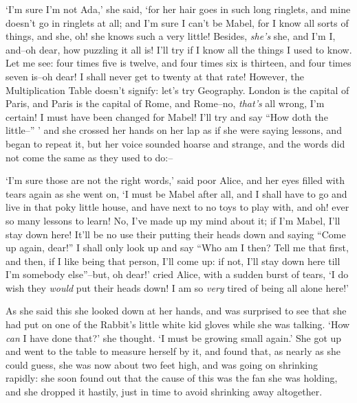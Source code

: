   `I'm sure I'm not Ada,' she said, `for her hair goes in such
long ringlets, and mine doesn't go in ringlets at all; and I'm
sure I can't be Mabel, for I know all sorts of things, and she,
oh! she knows such a very little!  Besides, {\it she's} she, and I'm I,
and--oh dear, how puzzling it all is!  I'll try if I know all the
things I used to know.  Let me see:  four times five is twelve,
and four times six is thirteen, and four times seven is--oh dear!
I shall never get to twenty at that rate!  However, the
Multiplication Table doesn't signify:  let's try Geography.
London is the capital of Paris, and Paris is the capital of Rome,
and Rome--no, {\it that's} all wrong, I'm certain!  I must have been
changed for Mabel!  I'll try and say ``How doth the little--'' '
and she crossed her hands on her lap as if she were saying lessons,
and began to repeat it, but her voice sounded hoarse and
strange, and the words did not come the same as they used to do:--

\onelineskip
{}
\onelineskip

\onelineskip

  `I'm sure those are not the right words,' said poor Alice, and
her eyes filled with tears again as she went on, `I must be Mabel
after all, and I shall have to go and live in that poky little
house, and have next to no toys to play with, and oh! ever so
many lessons to learn!  No, I've made up my mind about it; if I'm
Mabel, I'll stay down here!  It'll be no use their putting their
heads down and saying ``Come up again, dear!''  I shall only look
up and say ``Who am I then?  Tell me that first, and then, if I
like being that person, I'll come up:  if not, I'll stay down
here till I'm somebody else''--but, oh dear!' cried Alice, with a
sudden burst of tears, `I do wish they {\it would} put their heads
down!  I am so {\it very} tired of being all alone here!'

  As she said this she looked down at her hands, and was
surprised to see that she had put on one of the Rabbit's little
white kid gloves while she was talking.  `How {\it can} I have done
that?' she thought.  `I must be growing small again.'  She got up
and went to the table to measure herself by it, and found that,
as nearly as she could guess, she was now about two feet high,
and was going on shrinking rapidly:  she soon found out that the
cause of this was the fan she was holding, and she dropped it
hastily, just in time to avoid shrinking away altogether.

